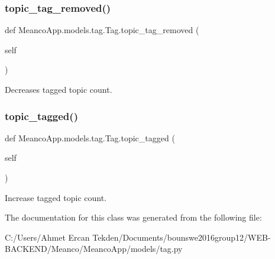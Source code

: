 \subsubsection{\texorpdfstring{topic\+\_\+tag\+\_\+removed()}{topic\_tag\_removed()}}
{\footnotesize\ttfamily def Meanco\+App.\+models.\+tag.\+Tag.\+topic\+\_\+tag\+\_\+removed (\begin{DoxyParamCaption}\item[{}]{self }\end{DoxyParamCaption})}



Decreases tagged topic count. 

\hypertarget{class_meanco_app_1_1models_1_1tag_1_1_tag_aa38cc1143437c5e7d0d9cdeb90d93207}{}\label{class_meanco_app_1_1models_1_1tag_1_1_tag_aa38cc1143437c5e7d0d9cdeb90d93207} 
\subsubsection{\texorpdfstring{topic\+\_\+tagged()}{topic\_tagged()}}
{\footnotesize\ttfamily def Meanco\+App.\+models.\+tag.\+Tag.\+topic\+\_\+tagged (\begin{DoxyParamCaption}\item[{}]{self }\end{DoxyParamCaption})}



Increase tagged topic count. 



The documentation for this class was generated from the following file\+:\begin{DoxyCompactItemize}
\item 
C\+:/\+Users/\+Ahmet Ercan Tekden/\+Documents/bounswe2016group12/\+W\+E\+B-\/\+B\+A\+C\+K\+E\+N\+D/\+Meanco/\+Meanco\+App/models/tag.\+py\end{DoxyCompactItemize}
